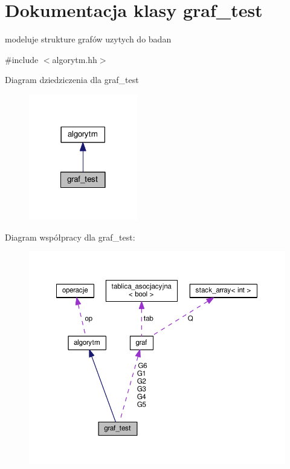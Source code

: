 \hypertarget{classgraf__test}{\section{Dokumentacja klasy graf\-\_\-test}
\label{classgraf__test}
}


modeluje strukture grafów uzytych do badan  




{\ttfamily \#include $<$algorytm.\-hh$>$}



Diagram dziedziczenia dla graf\-\_\-test\nopagebreak
\begin{figure}[H]
\begin{center}
\leavevmode
\includegraphics[width=134pt]{classgraf__test__inherit__graph}
\end{center}
\end{figure}


Diagram współpracy dla graf\-\_\-test\-:\nopagebreak
\begin{figure}[H]
\begin{center}
\leavevmode
\includegraphics[width=350pt]{classgraf__test__coll__graph}
\end{center}
\end{figure}
